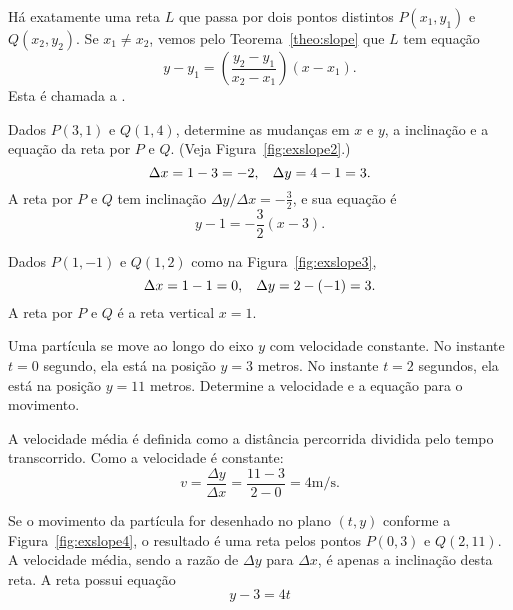 \documentclass{svmono}
\begin{document}

Há exatamente uma reta $L$ que passa por dois pontos distintos
$P(x_1,y_1)$ e $Q(x_2, y_2)$. Se $x_1 \ne x_2$, vemos pelo
Teorema~\ref{theo:slope} que $L$ tem equação
\[
  y - y_1 = \left( \frac{y_2 - y_1}{x_2 - x_1} \right) (x - x_1).
\]
Esta é chamada a .

\begin{example}
Dados $P(3,1)$ e $Q(1,4)$, determine as mudanças em $x$ e $y$,
a inclinação e a equação da reta por $P$ e $Q$. (Veja
Figura~\ref{fig:exslope2}.)
\[
  \Delta x = 1 - 3 = -2, \hspace{2ex} \Delta y = 4 - 1 = 3.
\]
A reta por $P$ e $Q$ tem inclinação $\Delta y / \Delta x = -\frac{3}{2}$,
e sua equação é
\[
  y - 1 = -\frac{3}{2}(x-3).
\]
\end{example}


\begin{example}
Dados $P(1,-1)$ e $Q(1,2)$ como na Figura~\ref{fig:exslope3},
\[
  \Delta x = 1 - 1 = 0, \hspace{2ex} \Delta y = 2 - (-1) = 3.
\]
A reta por $P$ e $Q$ é a reta vertical $x = 1$.
\end{example}


\begin{example}
Uma partícula se move ao longo do eixo $y$ com velocidade
constante. No instante $t=0$ segundo, ela está na posição
$y = 3$ metros. No instante $t = 2$ segundos, ela está na
posição $y = 11$ metros. Determine a velocidade e a
equação para o movimento.

A velocidade média é definida como a distância percorrida dividida
pelo tempo transcorrido. Como a velocidade é constante:
\[
  v = \frac{\Delta y}{\Delta x} = \frac{11-3}{2-0} = 4 \text{m/s}.
\]

Se o movimento da partícula for desenhado no plano $(t,y)$
conforme a Figura~\ref{fig:exslope4}, o resultado é uma reta
pelos pontos $P(0,3)$ e $Q(2,11)$. A velocidade média,
sendo a razão de $\Delta y$ para $\Delta x$, é apenas a
inclinação desta reta. A reta possui equação
\[
  y - 3 = 4t
\]
\end{example}

\end{document}
